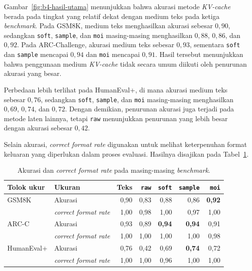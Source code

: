 Gambar~\ref{fig:b4-hasil-utama} menunjukkan bahwa akurasi metode
\textit{KV-cache} berada pada tingkat yang relatif dekat dengan medium teks
pada ketiga \textit{benchmark}. Pada GSM8K, medium teks menghasilkan akurasi
sebesar $0{,}90$, sedangkan \texttt{soft}, \texttt{sample}, dan \texttt{moi}
masing-masing menghasilkan $0{,}88$, $0{,}86$, dan $0{,}92$. Pada ARC-Challenge,
akurasi medium teks sebesar $0{,}93$, sementara \texttt{soft} dan
\texttt{sample} mencapai $0{,}94$ dan \texttt{moi} mencapai $0{,}91$.
Hasil tersebut menunjukkan bahwa penggunaan medium \textit{KV-cache} tidak
secara umum diikuti oleh penurunan akurasi yang besar.

Perbedaan lebih terlihat pada HumanEval+, di mana akurasi medium teks sebesar
$0{,}76$, sedangkan \texttt{soft}, \texttt{sample}, dan \texttt{moi}
masing-masing menghasilkan $0{,}69$, $0{,}74$, dan $0{,}72$. Dengan demikian,
penurunan akurasi juga terjadi pada metode laten lainnya, tetapi
\texttt{raw} menunjukkan penurunan yang lebih besar dengan akurasi sebesar
$0{,}42$.

Selain akurasi, \textit{correct format rate} digunakan untuk melihat keterpenuhan format
keluaran yang diperlukan dalam proses evaluasi. Hasilnya disajikan pada
Tabel~\ref{tab:akurasi-format}.

\begin{table}[H]
    \centering
    \caption{Akurasi dan \textit{correct format rate} pada masing-masing
    \textit{benchmark}.}
    \label{tab:akurasi-format}
    \small
    \begin{tabular}{llrrrrr}
        \hline
        Tolok ukur & Ukuran & Teks & \texttt{raw} & \texttt{soft}
        & \texttt{sample} & \texttt{moi} \\
        \hline
        GSM8K & Akurasi
        & 0,90 & 0,83 & 0,88 & 0,86 & \textbf{0,92} \\
        & \textit{correct format rate}
        & 1,00 & 0,98 & 1,00 & 0,97 & 1,00 \\
        \hline
        ARC-C & Akurasi
        & 0,93 & 0,89 & \textbf{0,94} & \textbf{0,94} & 0,91 \\
        & \textit{correct format rate}
        & 1,00 & 1,00 & 1,00 & 1,00 & 0,98 \\
        \hline
        HumanEval+ & Akurasi
        & 0,76 & 0,42 & 0,69 & \textbf{0,74} & 0,72 \\
        & \textit{correct format rate}
        & 1,00 & 1,00 & 0,96 & 1,00 & 1,00 \\
        \hline
    \end{tabular}
\end{table}

